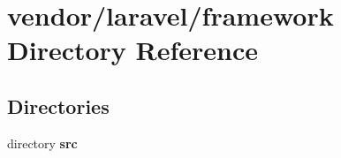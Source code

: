 \section{vendor/laravel/framework Directory Reference}
\label{dir_dff0fe4ad93cdf8ca708d70a0cb90bec}
\subsection*{Directories}
\begin{DoxyCompactItemize}
\item 
directory {\bf src}
\end{DoxyCompactItemize}
